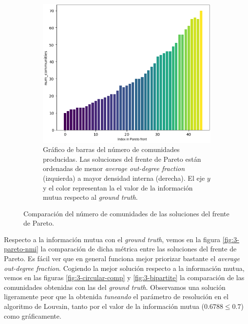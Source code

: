 \begin{figure}[!htb]
\begin{subfigure}{.48\textwidth}
    \includegraphics[width=\linewidth]{img/3_num_communities_pareto_2}
    \caption{Gráfico de barras del número de comunidades producidas. Las
      soluciones del frente de Pareto están ordenadas de menor \emph{average
      out-degree fraction} (izquierda) a mayor densidad interna (derecha). El
      eje \(y\) y el color representan la el valor de la información mutua
      respecto al \emph{ground truth}.}
  \label{fig:3-pareto-num-coms-2}
  \end{subfigure}
  \caption{Comparación del número de comunidades de las soluciones del frente
  de Pareto.}
  \label{fig:3-pareto-num-coms}
\end{figure}

Respecto a la información mutua con el \emph{ground truth}, vemos en la figura
\ref{fig:3-pareto-nmi} la comparación de dicha métrica entre las soluciones
del frente de Pareto. Es fácil ver que en general funciona mejor priorizar
bastante el \emph{average out-degree fraction}. Cogiendo la mejor solución
respecto a la información mutua, vemos en las figuras \ref{fig:3-circular-comp} y
\ref{fig:3-bipartite} la comparación de las comunidades obtenidas con las del
\emph{ground truth}. Observamos una solución ligeramente peor que la obtenida
\emph{tuneando} el parámetro de resolución en el algoritmo de Louvain, tanto
por el valor de la información mutua (\(0.6788 \leq 0.7\)) como gráficamente.

